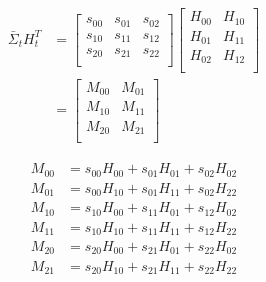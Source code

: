 \documentclass[oneside, 12pt, a4paper]{book}
\begin{document}
\begin{equation}
    \begin{split}
        \bar{\Sigma}_t H_t^T &= 
        \begin{bmatrix}
            s_{00} & s_{01} & s_{02}\\
            s_{10} & s_{11} & s_{12}\\
            s_{20} & s_{21} & s_{22}\\ 
        \end{bmatrix}
        \begin{bmatrix}
            H_{00} & H_{10}\\
            H_{01} & H_{11}\\ 
            H_{02} & H_{12}\\
        \end{bmatrix}\\
        &= 
        \begin{bmatrix}
            M_{00} & M_{01}\\
            M_{10} & M_{11}\\ 
            M_{20} & M_{21}\\
        \end{bmatrix}
    \end{split}
\end{equation}

\begin{equation}
    \begin{split}
        M_{00} &= s_{00}H_{00} + s_{01}H_{01} + s_{02}H_{02} \\
        M_{01} &= s_{00}H_{10} + s_{01}H_{11} + s_{02}H_{22} \\
        M_{10} &= s_{10}H_{00} + s_{11}H_{01} + s_{12}H_{02} \\
        M_{11} &= s_{10}H_{10} + s_{11}H_{11} + s_{12}H_{22} \\
        M_{20} &= s_{20}H_{00} + s_{21}H_{01} + s_{22}H_{02} \\
        M_{21} &= s_{20}H_{10} + s_{21}H_{11} + s_{22}H_{22} \\
    \end{split}
\end{equation}
\end{document}
